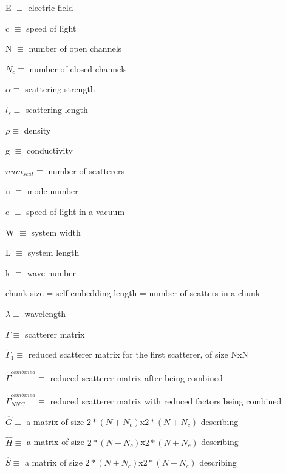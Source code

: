 E $\equiv$ electric field

c $\equiv$ speed of light


N $\equiv$ number of open channels

$N_c \equiv$ number of closed channels

$\alpha \equiv$ scattering strength

$l_s \equiv$ scattering length

$\rho \equiv$ density

g $\equiv$ conductivity

$num_{scat} \equiv$ number of scatterers

n $\equiv$ mode number

c $\equiv$ speed of light in a vacuum

W $\equiv$ system width

L $\equiv$ system length

k $\equiv$ wave number

chunk size = self embedding length = number of scatters in a chunk

$\lambda \equiv$ wavelength

$\Gamma \equiv$ scatterer matrix

$\tilde{ \Gamma} _1 \equiv$ reduced scatterer matrix for the first scatterer, of size NxN

$\tilde{ \Gamma} ^{combined} \equiv$ reduced scatterer matrix after being combined

$\tilde{ \Gamma} _{NNC} ^{combined} \equiv$ reduced scatterer matrix with reduced factors being combined

$\hat{G} \equiv$ a matrix of size $2*(N+N_c)$x$2*(N+N_c)$ describing

$\hat{H} \equiv$ a matrix of size $2*(N+N_c)$x$2*(N+N_c)$ describing

$\hat{S} \equiv$ a matrix of size $2*(N+N_c)$x$2*(N+N_c)$ describing